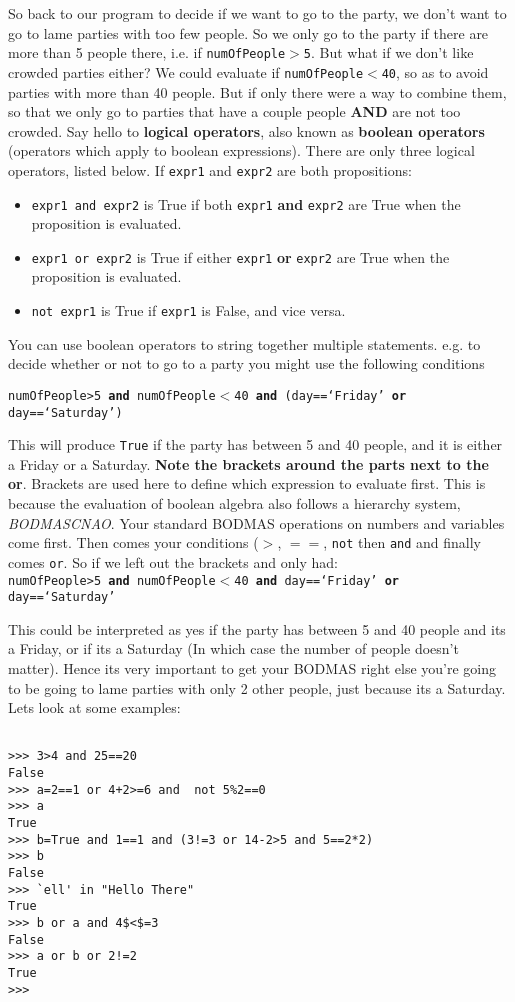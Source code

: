 So back to our program to decide if we want to go to the party, we don't want to go to lame parties with too few people. So we only go to the party if there are more than 5 people there, i.e. if 
\texttt{numOfPeople$>$5}. But what if we don't like crowded parties either? We could evaluate if 
\texttt{numOfPeople$<$40}, so as to avoid parties with more than 40 people. But if only there were a way to combine them, so that we only go to parties that have a couple people \textbf{AND} are not too crowded. Say hello to \textbf{logical operators}, also known   as \textbf{boolean operators} (operators which apply to boolean expressions). There   are only three logical operators, listed below. If \texttt{expr1} and \texttt{expr2}   are both propositions:
\begin{itemize}
	\item 
\texttt{expr1 and expr2} is True if both \texttt{expr1}    \textbf{and} \texttt{expr2} are True when the proposition is    evaluated.
	\item 
\texttt{expr1 or expr2} is True if either \texttt{expr1}    \textbf{or} \texttt{expr2} are True when the proposition is    evaluated.
	\item 
\texttt{not expr1} is True if \texttt{expr1} is False, and vice    versa.
\end{itemize}

 You can use boolean operators to string together multiple statements. e.g. to decide whether or not to go to a party you might use the following conditions


\texttt{numOfPeople>5 {\bfseries and} numOfPeople$<$40 \textbf{and} (day==`Friday' \textbf{or} day==`Saturday')}

 This will produce \texttt{True} if the party has between 5 and 40 people, and it is either a Friday or a Saturday. \textbf{Note the brackets around the parts next to the or}. Brackets are used here to define which expression to evaluate first. This is because the evaluation of boolean algebra also follows a hierarchy system, \textit{BODMASCNAO}. Your standard BODMAS operations on numbers and variables come first. Then comes your conditions ($>$, $==$, \texttt{not} then \texttt{and} and finally comes \texttt{or}. So if we left out the brackets and only had: \\
\texttt{numOfPeople>5 \textbf{and} numOfPeople$<$40 \textbf{and} day==`Friday' \textbf{or} day==`Saturday'}

 This could be interpreted as yes if the party has between 5 and 40 people and its a Friday, or if its a Saturday (In which case the number of people doesn't matter). Hence its very important to get your BODMAS right else you're going to be going to lame parties with only 2 other people, just because its a Saturday. Lets look at some examples:
\begin{lstlisting}
	
>>> 3>4 and 25==20
False
>>> a=2==1 or 4+2>=6 and  not 5%2==0
>>> a
True
>>> b=True and 1==1 and (3!=3 or 14-2>5 and 5==2*2)
>>> b
False
>>> `ell' in "Hello There"
True
>>> b or a and 4$<$=3
False
>>> a or b or 2!=2
True
>>>
		\end{lstlisting}

